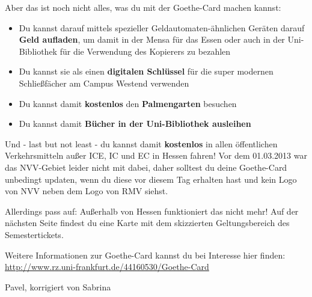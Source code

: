 Aber das ist noch nicht alles, was du mit der Goethe-Card machen kannst:

\begin{itemize}
	\item Du kannst darauf mittels spezieller Geldautomaten-ähnlichen Geräten darauf \textbf{Geld aufladen}, um damit in der Mensa für das Essen oder auch in der Uni-Bibliothek für die Verwendung des Kopierers zu bezahlen
	\item Du kannst sie als einen \textbf{digitalen Schlüssel} für die super modernen Schließfächer am Campus Westend verwenden
	\item Du kannst damit \textbf{kostenlos} den \textbf{Palmengarten} besuchen
	\item Du kannst damit\textbf{ Bücher in der Uni-Bibliothek ausleihen}
\end{itemize}

Und - last but not least - du kannst damit \textbf{kostenlos} in allen öffentlichen Verkehrsmitteln außer ICE, IC und EC in Hessen fahren! Vor dem 01.03.2013 war das NVV-Gebiet leider nicht mit dabei, daher solltest du deine Goethe-Card unbedingt updaten, wenn du diese vor diesem Tag erhalten hast und kein Logo von NVV neben dem Logo von RMV siehst.

Allerdings pass auf: Außerhalb von Hessen funktioniert das nicht mehr! Auf der nächsten Seite findest du eine Karte mit dem skizzierten Geltungsbereich des Semestertickets.

Weitere Informationen zur Goethe-Card kannst du bei Interesse hier finden:\\
\url{http://www.rz.uni-frankfurt.de/44160530/Goethe-Card}

\begin{flushright}Pavel, korrigiert von Sabrina \end{flushright}
